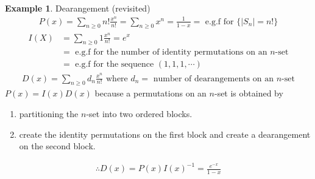 \documentclass{article}
\theoremstyle{definition}
\newtheorem{ex}{Example}[]
\begin{document}
\begin{ex}
    Dearangement (revisited) 
    \begin{align*}
        P(x) = \sum_{n \ge 0} n! \frac{x^n}{n!} = \sum_{n \ge 0} x^n 
        = \frac{1}{1-x} = \text{ e.g.f for } \{ \vert S_n \vert = n! \} 
    \end{align*}
    \begin{align*}
        I(X) &= \sum_{n\ge 0} 1 \frac{x^n}{n!} = e^x \\ 
        & = \text{ e.g.f for the number of identity permutations on an } n \text{-set} \\ 
        & = \text{ e.g.f for the sequence } (1, 1, 1, \cdots )
    \end{align*}
    \begin{align*}
        D(x) = \sum_{n\ge 0} d_n \frac{x^n}{n!} \text{ where } d_n= 
        \text{ number of dearangements on an } n \text{-set}
    \end{align*}
    $P(x) = I(x)D(x)$ because a permutations on an $n$-set is obtained by 
    \begin{enumerate}
        \item partitioning the $n$-set into two ordered blocks.
        \item create the identity permutations on the first block and
        create a dearangement on the second block.
    \end{enumerate}
    \begin{align*}
        \therefore D(x) = P(x)I(x)^{-1} = \frac{e^{-x}}{1-x}
    \end{align*}
\end{ex}
\end{document}
